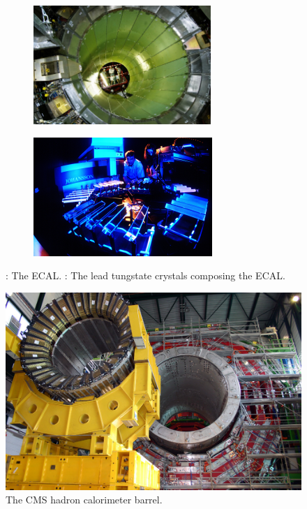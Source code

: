 	\begin{figure}[H]
		\begin{subfigure}{.5\linewidth}
			\centering
			\includegraphics[height = 4.5cm]{fig/chapt2/ECAL_barrel.jpg}
			\subcaption{\label{fig:ECAL:A}}
		\end{subfigure}
		\begin{subfigure}{.5\linewidth}
			\centering
			\includegraphics[height = 4.5cm]{fig/chapt2/ECAL_crystals.jpg}
			\subcaption{\label{fig:ECAL:B}}
		\end{subfigure}
		\caption{\label{fig:ECAL} : The \acl{ECAL}. : The lead tungstate crystals composing the ECAL.}
	\end{figure}
	
\begingroup\setlength{\intextsep}{5pt}\setlength{\columnsep}{15pt}
	
	\begin{figure}
		\centering
		\includegraphics[width = \linewidth]{fig/chapt2/HCAL.jpg}
		\caption{\label{fig:HCAL} The CMS hadron calorimeter barrel.}
	\end{figure}
	
